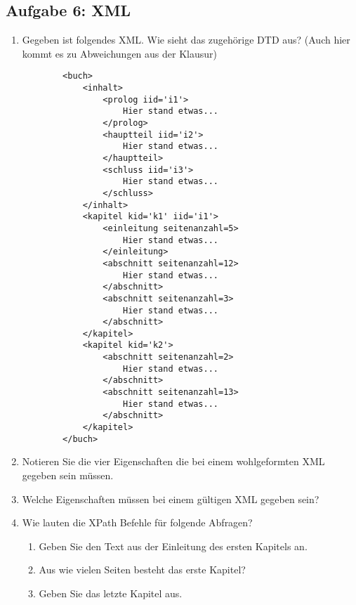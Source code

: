 \newpage
\subsection{Aufgabe 6: XML}
\label{sec:Aufgabe6}
\begin{enumerate}[label=\alph*)]
    \item Gegeben ist folgendes XML. Wie sieht das zugehörige DTD aus? (Auch hier kommt es zu Abweichungen aus der Klausur)
    \begin{verbatim}
        <buch>
            <inhalt>
                <prolog iid='i1'>
                    Hier stand etwas...
                </prolog>
                <hauptteil iid='i2'>
                    Hier stand etwas...
                </hauptteil>
                <schluss iid='i3'>
                    Hier stand etwas...
                </schluss>
            </inhalt>
            <kapitel kid='k1' iid='i1'>
                <einleitung seitenanzahl=5>
                    Hier stand etwas...
                </einleitung>
                <abschnitt seitenanzahl=12>
                    Hier stand etwas...
                </abschnitt>
                <abschnitt seitenanzahl=3>
                    Hier stand etwas...
                </abschnitt>
            </kapitel>
            <kapitel kid='k2'>
                <abschnitt seitenanzahl=2>
                    Hier stand etwas...
                </abschnitt>
                <abschnitt seitenanzahl=13>
                    Hier stand etwas...
                </abschnitt>
            </kapitel>
        </buch>
    \end{verbatim}
    
    \item Notieren Sie die vier Eigenschaften die bei einem wohlgeformten XML
        gegeben sein müssen.
    \item Welche Eigenschaften müssen bei einem gültigen XML gegeben sein?
    \item Wie lauten die XPath Befehle für folgende Abfragen?
    \begin{enumerate}[label=\arabic*.]
        \item Geben Sie den Text aus der Einleitung des ersten Kapitels an.
        \item Aus wie vielen Seiten besteht das erste Kapitel?
        \item Geben Sie das letzte Kapitel aus.
    \end{enumerate}
\end{enumerate}
